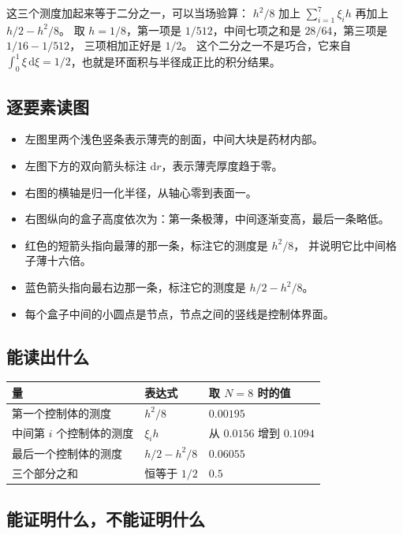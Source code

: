 \documentclass[11pt,a4paper]{article}
\begin{document}
这三个测度加起来等于二分之一，可以当场验算：
$h^2/8$ 加上 $\sum_{i=1}^{7}\xi_i h$ 再加上 $h/2-h^2/8$。
取 $h=1/8$，第一项是 $1/512$，中间七项之和是 $28/64$，第三项是 $1/16-1/512$，
三项相加正好是 $1/2$。
这个二分之一不是巧合，它来自
$\int_0^1 \xi\,\mathrm{d}\xi=1/2$，也就是环面积与半径成正比的积分结果。

\subsection{逐要素读图}

\begin{itemize}[leftmargin=1.6em]
\item 左图里两个浅色竖条表示薄壳的剖面，中间大块是药材内部。
\item 左图下方的双向箭头标注 $\mathrm{d}r$，表示薄壳厚度趋于零。
\item 右图的横轴是归一化半径，从轴心零到表面一。
\item 右图纵向的盒子高度依次为：第一条极薄，中间逐渐变高，最后一条略低。
\item 红色的短箭头指向最薄的那一条，标注它的测度是 $h^2/8$，
      并说明它比中间格子薄十六倍。
\item 蓝色箭头指向最右边那一条，标注它的测度是 $h/2-h^2/8$。
\item 每个盒子中间的小圆点是节点，节点之间的竖线是控制体界面。
\end{itemize}

\subsection{能读出什么}

\begin{center}
\begin{tabular}{@{}lll@{}}
\toprule
量 & 表达式 & 取 $N=8$ 时的值 \\
\midrule
第一个控制体的测度 & $h^2/8$ & $0.00195$ \\
中间第 $i$ 个控制体的测度 & $\xi_i h$ & 从 $0.0156$ 增到 $0.1094$ \\
最后一个控制体的测度 & $h/2-h^2/8$ & $0.06055$ \\
三个部分之和 & 恒等于 $1/2$ & $0.5$ \\
\bottomrule
\end{tabular}
\end{center}

\subsection{能证明什么，不能证明什么}
\end{document}
